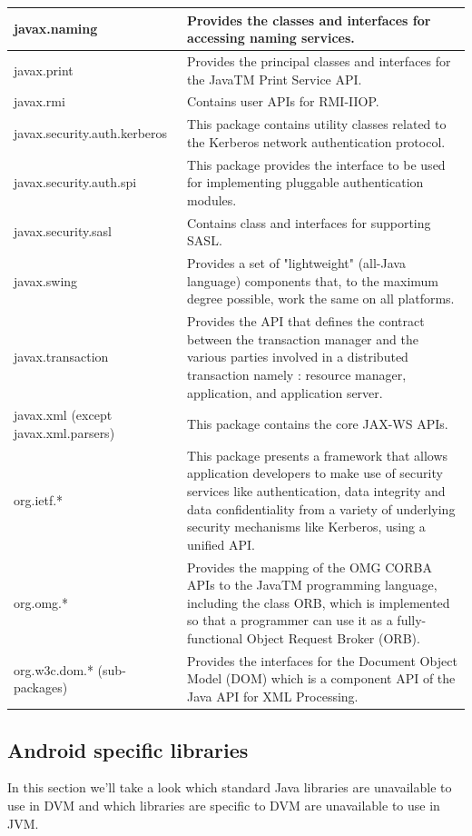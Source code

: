 \documentclass[11pt, oneside]{article}   	%
\begin{document}
\begin{longtable}{| p{5cm} | p{10cm} |}
javax.naming & Provides the classes and interfaces for accessing naming services.
\\ \hline
javax.print & Provides the principal classes and interfaces for the JavaTM Print Service API.
\\ \hline
javax.rmi & Contains user APIs for RMI-IIOP.
\\ \hline
javax.security.auth.kerberos & This package contains utility classes related to the Kerberos network authentication protocol.
\\ \hline
javax.security.auth.spi & This package provides the interface to be used for implementing pluggable authentication modules.
\\ \hline
javax.security.sasl & Contains class and interfaces for supporting SASL.
\\ \hline
javax.swing & Provides a set of "lightweight" (all-Java language) components that, to the maximum degree possible, work the same on all platforms.
\\ \hline
javax.transaction & Provides the API that defines the contract between the transaction manager and the various parties involved in a distributed transaction namely : resource manager, application, and application server.
\\ \hline
javax.xml (except javax.xml.parsers) & This package contains the core JAX-WS APIs.
\\ \hline
org.ietf.* & This package presents a framework that allows application developers to make use of security services like authentication, data integrity and data confidentiality from a variety of underlying security mechanisms like Kerberos, using a unified API.
\\ \hline
org.omg.* & Provides the mapping of the OMG CORBA APIs to the JavaTM programming language, including the class ORB, which is implemented so that a programmer can use it as a fully-functional Object Request Broker (ORB).
\\ \hline
org.w3c.dom.* (sub-packages) & Provides the interfaces for the Document Object Model (DOM) which is a component API of the Java API for XML Processing.
\\ \hline
\end{longtable}

\subsection{Android specific libraries}

In this section we'll take a look which standard Java libraries are unavailable to use in DVM and which libraries are specific to DVM are unavailable to use in JVM.
\end{document}
